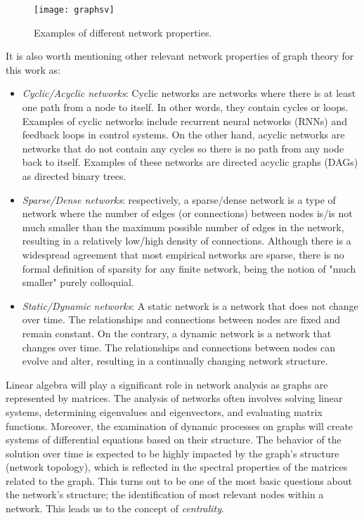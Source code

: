 \begin{figure}[h]\centering
	\texttt{[image: graphsv]}
	\caption{Examples of different network properties.}
	\label{fig:graphsv}
	\bigskip
\end{figure}

It is also worth mentioning other relevant network properties of graph theory for this work as:

\begin{itemize}
  \item \textit{Cyclic/Acyclic networks}: Cyclic networks are networks where there is at least one path from a node to itself. In other words, they contain cycles or loops. Examples of cyclic networks include recurrent neural networks (RNNs) and feedback loops in control systems. On the other hand, acyclic networks are networks that do not contain any cycles so there is no path from any node back to itself. Examples of these networks are directed acyclic graphs (DAGs) as directed binary trees.
  \item \textit{Sparse/Dense networks}: respectively, a sparse/dense network is a type of network where the number of edges (or connections) between nodes is/is not much smaller than the maximum possible number of edges in the network, resulting in a relatively low/high density of connections. Although there is a widespread agreement that most empirical networks are sparse, there is no formal definition of sparsity for any finite network, being the notion of "much smaller" purely colloquial.
  \item \textit{Static/Dynamic networks}: A static network is a network that does not change over time. The relationships and connections between nodes are fixed and remain constant. On the contrary, a dynamic network is a network that changes over time. The relationships and connections between nodes can evolve and alter, resulting in a continually changing network structure.
\end{itemize}

Linear algebra will play a significant role in network analysis as graphs are represented by matrices. The analysis of networks often involves solving linear systems, determining eigenvalues and eigenvectors, and evaluating matrix functions. Moreover, the examination of dynamic processes on graphs will create systems of differential equations based on their structure. The behavior of the solution over time is expected to be highly impacted by the graph's structure (network topology), which is reflected in the spectral properties of the matrices related to the graph. This turns out to be one of the most basic questions about the network's structure; the identification of most relevant nodes within a network. This leads us to the concept of \textit{centrality}.

